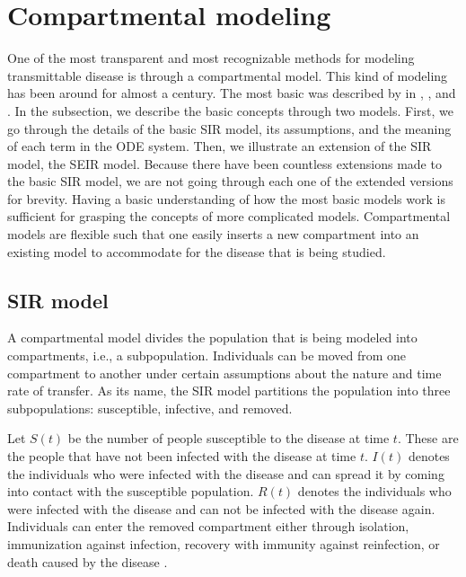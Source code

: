 \section{Compartmental modeling}
\label{sec:literature-review-compartmental-modeling}

One of the most transparent and most recognizable methods for modeling transmittable disease is through a compartmental model.
This kind of modeling has been around for almost a century.
The most basic was described by \citeauthor{kermackContributionMathematicalTheory1927} \cite{kermackContributionMathematicalTheory1927, kermackContributionsMathematicalTheory1932, kermackContributionsMathematicalTheory1933} in \citeyear{kermackContributionMathematicalTheory1927}, \citeyear{kermackContributionsMathematicalTheory1932}, and \citeyear{ kermackContributionsMathematicalTheory1933}.
In the subsection, we describe the basic concepts through two models.
First, we go through the details of the basic SIR model, its assumptions, and the meaning of each term in the \gls{ODE} system.
Then, we illustrate an extension of the SIR model, the SEIR model.
Because there have been countless extensions made to the basic SIR model, we are not going through each one of the extended versions for brevity.
Having a basic understanding of how the most basic models work is sufficient for grasping the concepts of more complicated models.
Compartmental models are flexible such that one easily inserts a new compartment into an existing model to accommodate for the disease that is being studied.

\subsection{SIR model}

A compartmental model divides the population that is being modeled into compartments, i.e., a subpopulation.
Individuals can be moved from one compartment to another under certain assumptions about the nature and time rate of transfer.
As its name, the SIR model partitions the population into three subpopulations: susceptible, infective, and removed.

Let $S(t)$ be the number of people susceptible to the disease at time $t$.
These are the people that have not been infected with the disease at time $t$.
$I(t)$ denotes the individuals who were infected with the disease and can spread it by coming into contact with the susceptible population.
$R(t)$ denotes the individuals who were infected with the disease and can not be infected with the disease again.
Individuals can enter the removed compartment either through isolation, immunization against infection, recovery with immunity against reinfection, or death caused by the disease \cite{brauerCompartmentalModelsEpidemiology2008}.

